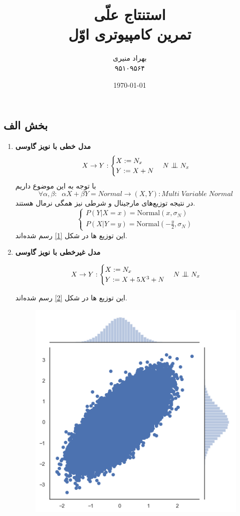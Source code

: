 \documentclass[papersize=a4]{report}
\title{استنتاج علّی\\تمرین کامپیوتری اوّل}
\author{بهراد منیری \\ ۹۵۱۰۹۵۶۴}
\date{\today}
\newcommand{\bigCI}{\mathrel{\text{\scalebox{1.07}{$\perp\mkern-10mu\perp$}}}}
\begin{document}
\doublespacing
\maketitle
\chapter{}	
\section{بخش الف}

\begin{enumerate}
	\item 	\textbf{مدل خطی با نویز گاوسی}
	$$
	X \rightarrow Y :
	\begin{cases}
	X := N_x\\
	Y := X + N 
	\end{cases}
	N \bigCI N_x
	$$
	با توجه به این موضوع داریم
	$$\forall \alpha, \beta: \;\;  \alpha X + \beta Y = Normal \rightarrow (X, Y): Multi\;Variable\;Normal$$
	در نتیجه توزیع‌های مارجینال و شرطی نیز همگی نرمال هستند.
$$
\begin{cases}
P(Y|X=x) = \textrm{Normal}(x, \sigma_N)\\ 
P(X|Y=y) = \textrm{Normal}(-\frac{y}{2}, \sigma_N)
\end{cases}
$$
این توزیع ها در شکل 
\eqref{1}
رسم شده‌اند.

	
\item 	\textbf{مدل غیرخطی با نویز گاوسی}

$$
X \rightarrow Y :
\begin{cases}
X := N_x\\
Y := X + 5X^3 + N 
\end{cases}
N \bigCI N_x
$$


این توزیع ها در شکل 
\eqref{2}
رسم شده‌اند.

	\begin{figure}
		\centering
			\includegraphics[scale=0.35]{lin_cond1.png}
		\begin{floatrow}


\end{floatrow}
\end{figure}
\end{enumerate}
\end{document}

